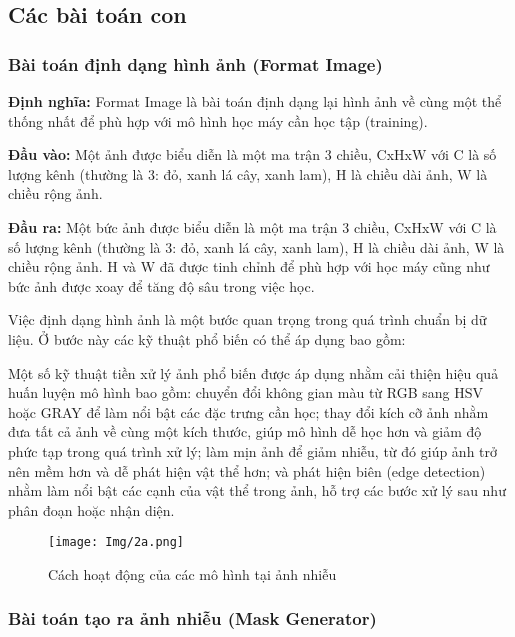 \documentclass[12pt]{report}
\begin{document}
\subsection{Các bài toán con}

\subsubsection{Bài toán định dạng hình ảnh (Format Image)}

\textbf{Định nghĩa:} Format Image là bài toán định dạng lại hình ảnh về cùng một thể thống nhất để phù hợp với mô hình học máy cần học tập (training).

\textbf{Đầu vào:} Một ảnh được biểu diễn là một ma trận 3 chiều, CxHxW với C là số lượng kênh (thường là 3: đỏ, xanh lá cây, xanh lam), H là chiều dài ảnh, W là chiều rộng ảnh.

\textbf{Đầu ra:} Một bức ảnh được biểu diễn là một ma trận 3 chiều, CxHxW với C là số lượng kênh (thường là 3: đỏ, xanh lá cây, xanh lam), H là chiều dài ảnh, W là chiều rộng ảnh. H và W đã được tinh chỉnh để phù hợp với học máy cũng như bức ảnh được xoay để tăng độ sâu trong việc học.

Việc định dạng hình ảnh là một bước quan trọng trong quá trình chuẩn bị dữ liệu. Ở bước này các kỹ thuật phổ biến có thể áp dụng bao gồm:

Một số kỹ thuật tiền xử lý ảnh phổ biến được áp dụng nhằm cải thiện hiệu quả huấn luyện mô hình bao gồm: chuyển đổi không gian màu từ RGB sang HSV hoặc GRAY để làm nổi bật các đặc trưng cần học; thay đổi kích cỡ ảnh nhằm đưa tất cả ảnh về cùng một kích thước, giúp mô hình dễ học hơn và giảm độ phức tạp trong quá trình xử lý; làm mịn ảnh để giảm nhiễu, từ đó giúp ảnh trở nên mềm hơn và dễ phát hiện vật thể hơn; và phát hiện biên (edge detection) nhằm làm nổi bật các cạnh của vật thể trong ảnh, hỗ trợ các bước xử lý sau như phân đoạn hoặc nhận diện.


\vspace{1em}
\begin{figure}[H]
    \centering
    \texttt{[image: Img/2a.png]}
    \caption{Cách hoạt động của các mô hình tại ảnh nhiễu}
    \label{fig:2.15}
\end{figure}
\vspace{0.5em}

\subsubsection{Bài toán tạo ra ảnh nhiễu (Mask Generator)}
\end{document}
